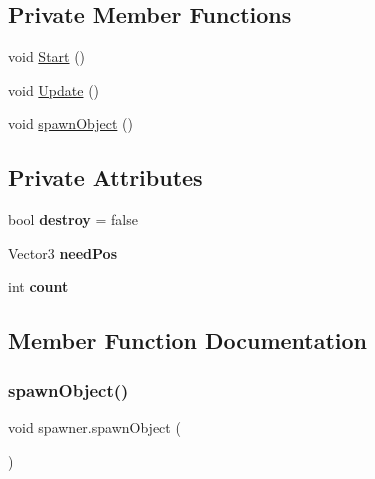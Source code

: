 \subsection*{Private Member Functions}
\begin{DoxyCompactItemize}
\item 
void \hyperlink{classspawner_a4c368d2128f5f93a642d914c2b225faa}{Start} ()
\item 
void \hyperlink{classspawner_a845575b9eb2f04efe3b2eaa28a98f568}{Update} ()
\item 
void \hyperlink{classspawner_a1a8587eb2ec4c5425d35d72afc7d4fac}{spawn\+Object} ()
\end{DoxyCompactItemize}
\subsection*{Private Attributes}
\begin{DoxyCompactItemize}
\item 
\mbox{\label{classspawner_ad72aef5697930fa5487db0aed9f79ea4}} 
bool {\bfseries destroy} = false
\item 
\mbox{\label{classspawner_af51dd7efca34ffe93d07b541706a2044}} 
Vector3 {\bfseries need\+Pos}
\item 
\mbox{\label{classspawner_adf250238c6d94158b2a4eff04c9d27a1}} 
int {\bfseries count}
\end{DoxyCompactItemize}


\subsection{Member Function Documentation}
\mbox{\label{classspawner_a1a8587eb2ec4c5425d35d72afc7d4fac}} 
\subsubsection{\texorpdfstring{spawn\+Object()}{spawnObject()}}
{\footnotesize\ttfamily void spawner.\+spawn\+Object (\begin{DoxyParamCaption}{ }\end{DoxyParamCaption})\hspace{0.3cm}{\ttfamily [private]}}

